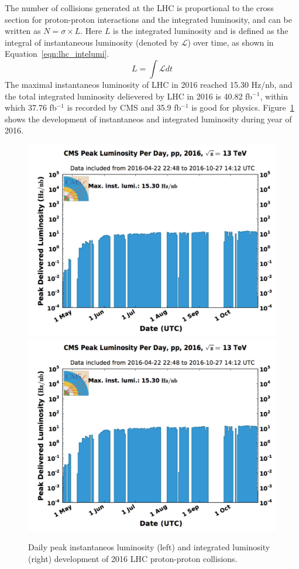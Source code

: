 \vspace{0.3cm}
The number of collisions generated at the LHC is proportional to the cross section for proton-proton interactions and the integrated luminosity, and can be written as $N=\sigma \times L$. Here $L$ is the integrated luminosity and is defined as the integral of instantaneous luminosity (denoted by $\mathcal{L}$) over time, as shown in Equation~\ref{eqn:lhc_intelumi}.
\begin{equation}
L=\int \mathcal{L}dt
\label{eqn:lhc_intelumi}
\end{equation}
The maximal instantaneos luminosity of LHC in 2016 reached 15.30 Hz/nb, and the total integrated luminosity delievered by LHC in 2016 is 40.82 fb$^{-1}$, within which 37.76 fb$^{-1}$ is recorded by CMS and 35.9 fb$^{-1}$ is good for physics. Figure~\ref{fig:lhc_lumi2016} shows the development of instantaneos and integrated luminosity during year of 2016.

\begin{figure}[htbp]
\begin{center}
\includegraphics[width=0.49\linewidth, page=1]{figures/lhc_lumi2016.pdf}
\includegraphics[width=0.49\linewidth, page=2]{figures/lhc_lumi2016.pdf}
\caption{Daily peak instantaneos luminosity (left) and integrated luminosity (right) development of 2016 LHC proton-proton collisions.}
\label{fig:lhc_lumi2016}
\end{center}
\end{figure}

